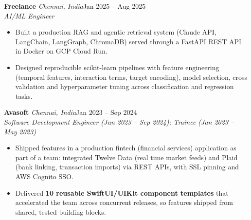 \documentclass[a4paper,11pt]{article}
\newcommand{\role}[4]{%
  \textbf{#1}{\color{muted}\,\textperiodcentered\,\textit{#2}}\hfill{\color{muted}#3}\\
  \textit{#4}\par}
\newcommand{\gap}{\vspace{5pt}}
\newcommand{\num}[1]{\textbf{#1}}   %
\begin{document}
\gap
{}
\role{Freelance}{Chennai, India}{Jan 2025 – Aug 2025}{AI/ML Engineer}
\begin{itemize}
  \item Built a production RAG and agentic retrieval system (Claude API, LangChain, LangGraph, ChromaDB) served through a FastAPI REST API in Docker on GCP Cloud Run.
  \item Designed reproducible scikit-learn pipelines with feature engineering (temporal features, interaction terms, target encoding), model selection, cross validation and hyperparameter tuning across classification and regression tasks.
\end{itemize}
\gap
{}
\role{Avasoft}{Chennai, India}{Jan 2023 – Sep 2024}{Software Development Engineer (Jun 2023 – Sep 2024); Trainee (Jan 2023 – May 2023)}
\begin{itemize}
  \item Shipped features in a production fintech (financial services) application as part of a team: integrated Twelve Data (real time market feeds) and Plaid (bank linking, transaction imports) via REST APIs, with SSL pinning and AWS Cognito SSO.
  \item Delivered \num{10 reusable SwiftUI/UIKit component templates} that accelerated the team across concurrent releases, so features shipped from shared, tested building blocks.
\end{itemize}
\end{document}
